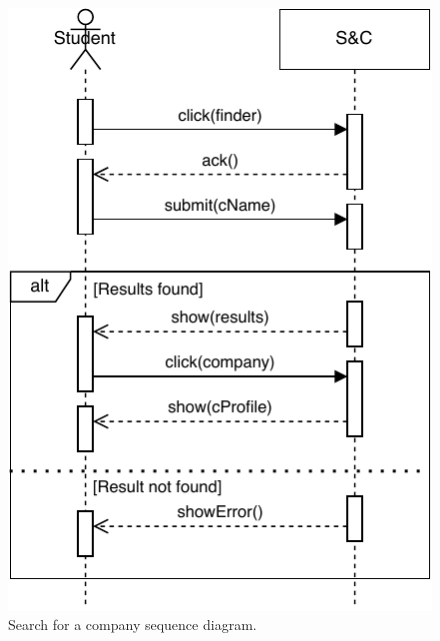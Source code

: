 \begin{figure}[H]
    \begin{center}
        \includegraphics[width=\linewidth]{Images/SequenceDiagram/SearchCompanySD.pdf}
        \caption{Search for a company sequence diagram.}
        \label{fig:search_for_a_company_seqdiag}%
    \end{center}
\end{figure}


